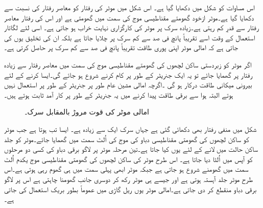 اس مساوات کو شکل   میں دکھایا گیا ہے۔ اس شکل میں موٹر کی رفتار کو معاصر رفتار کی نسبت سے دکھایا گیا ہے۔موٹر ازخود گھومتے مقناطیسی موج کی سمت میں گھومتی ہے اور اس کی رفتار معاصر رفتار سے قدرِ کم رہتی ہے۔زیادہ سرک پر موٹر کی کارگزاری نہایت خراب ہو جاتی ہے۔ اسی لئے  لگاتار استعمال کے وقت اسے تقریباً پانچ فی صد سے کم سرک پر چلایا جاتا ہے بلکہ ان کی تخلیق یوں کی جاتی ہے کہ امالی موٹر اپنی پوری طاقت تقریباً پانچ فی صد سے کم سرک پر حاصل کرتی ہے۔ 

اگر موٹر کو زبردستی ساکن لچھوں کی گھومتے مقناطیسی موج کی سمت میں معاصر رفتار سے زیادہ رفتار پر گھمایا جائے تو یہ ایک جنریٹر کے طور پر کام کرنے شروع ہو جائے گی۔ایسا کرنے کے لئے بیرونی میکانی طاقت درکار ہو گی ۔اگرچہ امالی مشین عام طور پر جنریٹر کے طور پر استعمال نہیں ہوتے البتہ ہوا سے برقی طاقت پیدا کرنے میں یہ جنریٹر کے طور پر کار آمد ثابت ہوتے ہیں۔
\begin{figure}
\centering
\caption{امالی موٹر کی قوت مروڑ بالمقابل سرک۔}
\label{شکل_امالی_مروڑ_بالمقابل_رفتار}
\end{figure}

شکل  میں منفی رفتار بھی دکھائی گئی ہے جہاں سرک ایک سے زیادہ ہے۔ ایسا تب ہوتا ہے جب موٹر کو ساکن لچھوں کی گھومتی مقناطیسی دباو کی موج کی اُلٹ سمت میں گھمایا جائے۔موٹر کو جلد ساکن حالت میں لانے کے لئے یوں کیا جاتا ہے۔تین مرحلہ موٹر پر لاگو برقی دباو کی کسی دو مرحلوں کو آپس میں اُلٹا دیا جاتا ہے۔ اس طرح موٹر کی ساکن لچھوں کی گھومتی مقناطیسی موج یکدم اُلٹ سمت میں گھومنے شروع ہو جاتی ہے جبکہ موٹر ابھی پہلی سمت میں ہی گھوم رہی ہوتی ہے۔اس طرح موٹر جلد آہستہ ہوتی ہے اور جیسے ہی موٹر رکھ کر دوسری جانب گھومنا چاہتی ہے اس پر لاگو برقی دباو منقطع کر دی جاتی ہے۔امالی موٹر یوں ریل  گاڑی میں عموماً بطور بریک استعمال کی جاتی ہے۔


